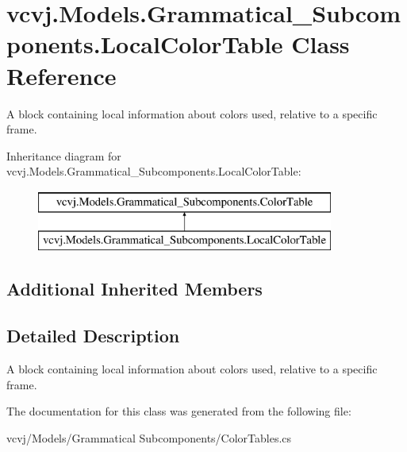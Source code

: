 \hypertarget{classvcvj_1_1_models_1_1_grammatical___subcomponents_1_1_local_color_table}{}\section{vcvj.\+Models.\+Grammatical\+\_\+\+Subcomponents.\+Local\+Color\+Table Class Reference}
\label{classvcvj_1_1_models_1_1_grammatical___subcomponents_1_1_local_color_table}


A block containing local information about colors used, relative to a specific frame.  


Inheritance diagram for vcvj.\+Models.\+Grammatical\+\_\+\+Subcomponents.\+Local\+Color\+Table\+:\begin{figure}[H]
\begin{center}
\leavevmode
\includegraphics[height=2.000000cm]{classvcvj_1_1_models_1_1_grammatical___subcomponents_1_1_local_color_table}
\end{center}
\end{figure}
\subsection*{Additional Inherited Members}


\subsection{Detailed Description}
A block containing local information about colors used, relative to a specific frame. 



The documentation for this class was generated from the following file\+:\begin{DoxyCompactItemize}
\item 
vcvj/\+Models/\+Grammatical Subcomponents/Color\+Tables.\+cs\end{DoxyCompactItemize}
